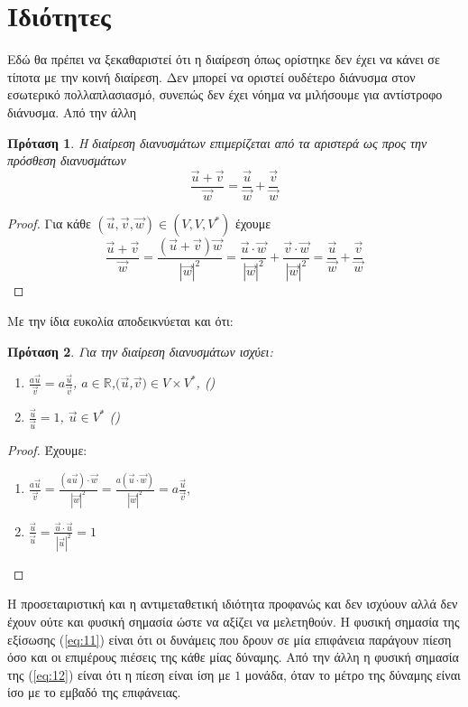 \documentclass[12pt,titlepage]{article}
\newtheorem{proposition}{Πρόταση}
\begin{document}
\section{Ιδιότητες}
Εδώ θα πρέπει να ξεκαθαριστεί ότι η διαίρεση όπως ορίστηκε δεν έχει να κάνει σε τίποτα με την κοινή διαίρεση. Δεν μπορεί να οριστεί ουδέτερο διάνυσμα στον εσωτερικό πολλαπλασιασμό, συνεπώς δεν έχει νόημα να μιλήσουμε για αντίστροφο διάνυσμα. Από την άλλη
\begin{proposition}
 Η διαίρεση διανυσμάτων επιμερίζεται από τα αριστερά ως προς την πρόσθεση διανυσμάτων
 \begin{equation} \label{eq:10}
  \frac{\vec{u}+\vec{v}}{\vec{w}}=\frac{\vec{u}}{\vec{w}}+\frac{\vec{v}}{\vec{w}}
 \end{equation}
\end{proposition}
\begin{proof}
 Για κάθε $(\vec{u},\vec{v},\vec{w})\in (V,V,V^*)$ έχουμε
 \begin{equation*} \label{eq:9}
  \frac{\vec{u}+\vec{v}}{\vec{w}}=\frac{(\vec{u}+\vec{v})\vec{w}}{|\vec{w}|^2}=\frac{\vec{u}\cdot\vec{w}}{|\vec{w}|^2}+\frac{\vec{v}\cdot\vec{w}}{\left|\vec{w}\right|^2} = \frac{\vec{u}}{\vec{w}}+\frac{\vec{v}}{\vec{w}}
 \end{equation*}
\end{proof}
Με την ίδια ευκολία αποδεικνύεται και ότι:
\begin{proposition}
 Για την διαίρεση διανυσμάτων ισχύει:
 \begin{enumerate}
   \label{eq:11}
  \item $\displaystyle \frac{a\vec{u}}{\vec{v}}=a\frac{\vec{u}}{\vec{v}}$, $a\in\mathbb{R}$,$(\vec{u}$,$\vec{v})\in V\times V^*$, \hfill \textnormal{()}   \label{eq:12}
  \item $\displaystyle \frac{\vec{u}}{\vec{u}}=1$, $\vec{u}\in V^*$ \hfill \textnormal{()}
 \end{enumerate}
\end{proposition}
\begin{proof}
 Έχουμε:
 \begin{enumerate}
  \item $\displaystyle \frac{a\vec{u}}{\vec{v}}=\frac{(a\vec{u})\cdot\vec{w}}{|\vec{w}|^2}=\frac{a(\vec{u}\cdot\vec{w})}{|\vec{w}|^2}=a\frac{\vec{u}}{\vec{v}}$,
  \item $\displaystyle \frac{\vec{u}}{\vec{u}}=\frac{\vec{u}\cdot\vec{u}}{|\vec{u}|^2}=1$
 \end{enumerate}
\end{proof}
Η προσεταιριστική και η αντιμεταθετική ιδιότητα προφανώς και δεν ισχύουν αλλά δεν έχουν ούτε και φυσική σημασία ώστε να αξίζει να μελετηθούν. Η φυσική σημασία της εξίσωσης (\ref{eq:11}) είναι ότι οι δυνάμεις που δρουν σε μία επιφάνεια παράγουν πίεση όσο και οι επιμέρους πιέσεις της κάθε μίας δύναμης. Από την άλλη η φυσική σημασία της (\ref{eq:12}) είναι ότι η πίεση είναι ίση με $1$ μονάδα, όταν το μέτρο της δύναμης είναι ίσο με το εμβαδό της επιφάνειας.
\end{document}

